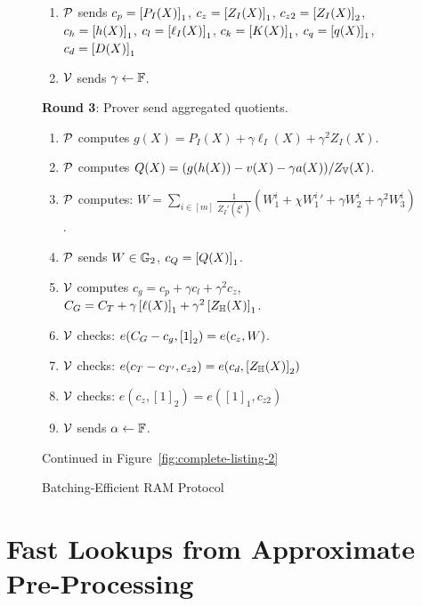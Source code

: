 \begin{figure}[t!]
\begin{mdframed}
\begin{enumerate}[leftmargin=1em, label=\arabic*.]
            \item $\mathcal{P}$ sends $c_p = \left[{P_I(X)}\right]_1$, $c_z=\left[{Z_I(X)}\right]_1$, $c_{z2}=\left[{Z_I(X)}\right]_2$, $c_h=\left[{h(X)}\right]_1$, $c_l = \left[{\ell_I(X)}\right]_1$,
            $c_k = \left[{K(X)}\right]_1$, $c_q = \left[{q(X)}\right]_1$, $c_d=\left[{D(X)}\right]_1$
            \item $\mathcal{V}$ sends $\gamma\gets \mathbb{F}$.
        \end{enumerate}

        {\bf Round 3}: Prover send aggregated quotients.
        \begin{enumerate}[leftmargin=1em, label=\arabic*.]
            \item $\mathcal{P}$ computes $g(X)=P_I(X) + \gamma \ell_I(X) + \gamma^2 Z_I(X)$.
            \item $\mathcal{P}$ computes $Q(X) = (g(h(X)) - v(X) -\gamma a(X))/Z_{\mathbb{V}}(X)$.
            \item $\mathcal{P}$ computes: $W = \sum_{i\in [m]} \frac{1}{Z_I'(\xi^i)} (W_1^i + \chi {W_1^i}' + \gamma W_2^i + \gamma^2 W_3^i)$.
            \item $\mathcal{P}$ sends $W\in \mathbb{G}_2$, $c_Q=\left[{Q(X)}\right]_1$.
            \item $\mathcal{V}$ computes $c_g = c_p + \gamma c_l + \gamma^2 c_z$, $C_G = C_T + \gamma\left[{\ell(X)}\right]_1+\gamma^2\left[{Z_\mathbb{H}(X)}\right]_1$.
            \item $\mathcal{V}$ checks: $e(C_G - c_g, \left[{1}\right]_2)=e(c_z, W)$.
            \item $\mathcal{V}$ checks: $e(c_T-c_{T'}, c_{z2})=e(c_d, \left[{Z_\mathbb{H}(X)}\right]_2)$
            \item $\mathcal{V}$ checks: $e(c_z, [1]_2)=e([1]_1, c_{z2})$
            \item $\mathcal{V}$ sends $\alpha\gets \mathbb{F}$.
        \end{enumerate}

        Continued in Figure~\ref{fig:complete-listing-2}
    \end{mdframed}
    \caption{Batching-Efficient RAM Protocol}
    \label{fig:complete-listing}
\end{figure}






\section{Fast Lookups from Approximate Pre-Processing}\label{sec:update-protocol}














